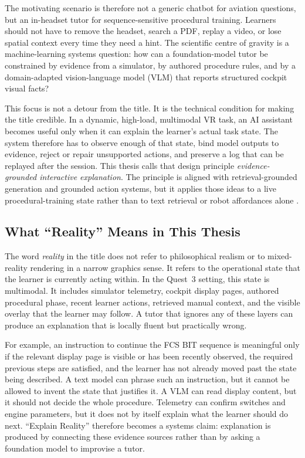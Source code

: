 The motivating scenario is therefore not a generic chatbot for aviation
questions, but an in-headset tutor for sequence-sensitive procedural training.
Learners should not have to remove the headset, search a PDF, replay a video,
or lose spatial context every time they need a hint. The scientific centre of
gravity is a machine-learning systems question: how can a foundation-model
tutor be constrained by evidence from a simulator, by authored procedure rules,
and by a domain-adapted vision-language model (VLM) that reports structured
cockpit visual facts?

This focus is not a detour from the title. It is the technical condition for
making the title credible. In a dynamic, high-load, multimodal VR task, an AI
assistant becomes useful only when it can explain the learner's actual task
state. The system therefore has to observe enough of that state, bind model
outputs to evidence, reject or repair unsupported actions, and preserve a log
that can be replayed after the session. This thesis calls that design principle
\emph{evidence-grounded interactive explanation}. The principle is aligned
with retrieval-grounded generation and grounded action systems, but it applies
those ideas to a live procedural-training state rather than to text retrieval
or robot affordances alone \citep{lewis2020rag,ahn2022saycan}.

\subsection{What ``Reality'' Means in This Thesis}

The word \emph{reality} in the title does not refer to philosophical realism or
to mixed-reality rendering in a narrow graphics sense. It refers to the
operational state that the learner is currently acting within. In the Quest~3
setting, this state is multimodal. It includes simulator telemetry, cockpit
display pages, authored procedural phase, recent learner actions, retrieved
manual context, and the visible overlay that the learner may follow. A tutor
that ignores any of these layers can produce an explanation that is locally
fluent but practically wrong.

For example, an instruction to continue the FCS BIT sequence is meaningful only
if the relevant display page is visible or has been recently observed, the
required previous steps are satisfied, and the learner has not already moved
past the state being described. A text model can phrase such an instruction,
but it cannot be allowed to invent the state that justifies it. A VLM can read
display content, but it should not decide the whole procedure. Telemetry can
confirm switches and engine parameters, but it does not by itself explain what
the learner should do next. ``Explain Reality'' therefore becomes a systems
claim: explanation is produced by connecting these evidence sources rather than
by asking a foundation model to improvise a tutor.

